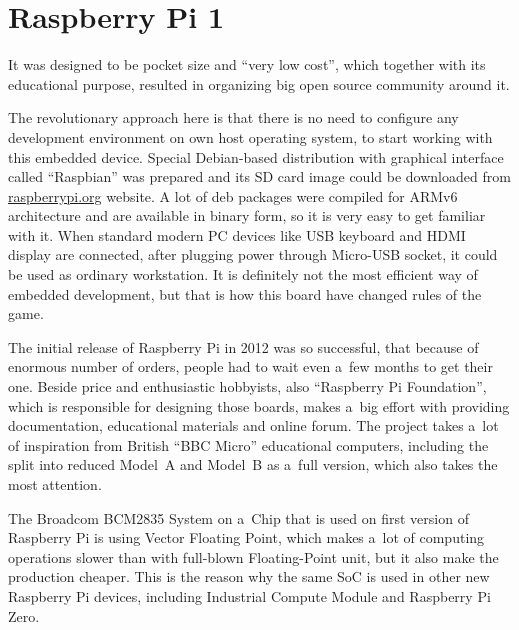 \documentclass[printmode]{mgr}
\begin{document}
\section{Raspberry Pi 1}


It was designed to be pocket size and ``very low cost''\cite{web:raspberrypi-lowcost}, which together with its educational purpose, resulted in organizing big open source community around it.

The revolutionary approach here is that there is no need to configure any development environment on own host operating system, to start working with this embedded device.
Special Debian-based distribution with graphical interface called ``Raspbian'' was prepared and its SD card image could be downloaded from \url{raspberrypi.org} website.
A lot of deb packages were compiled for ARMv6 architecture and are available in binary form, so it is very easy to get familiar with it.\cite{web:raspberrypi-raspbian}
When standard modern PC devices like USB keyboard and HDMI display are connected, after plugging power through Micro-USB socket, it could be used as ordinary workstation.
It is definitely not the most efficient way of embedded development, but that is how this board have changed rules of the game.

The initial release of Raspberry Pi in 2012 was so successful, that because of enormous number of orders, people had to wait even a~few months to get their one. 
Beside price and enthusiastic hobbyists, also ``Raspberry Pi Foundation'', which is responsible for designing those boards, makes a~big effort with providing documentation, educational materials and online forum.\cite{web:raspberrypi-forum}
The project takes a~lot of inspiration from British ``BBC Micro'' educational computers, including the split into reduced Model~A and Model~B as a~full version, which also takes the most attention.

The Broadcom BCM2835 System on a~Chip that is used on first version of Raspberry Pi is using Vector Floating Point, which makes a~lot of computing operations slower than with full-blown Floating-Point unit, but it also make the production cheaper.
This is the reason why the same SoC is used in other new Raspberry Pi devices, including Industrial Compute Module and Raspberry Pi Zero.
\end{document}
